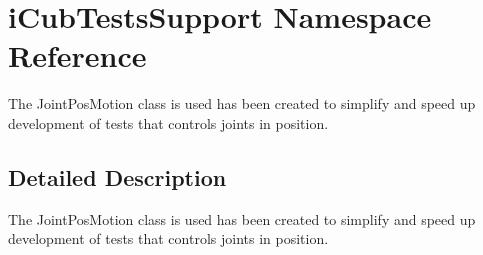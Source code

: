 \section{i\-Cub\-Tests\-Support Namespace Reference}
\label{namespaceiCubTestsSupport}


The Joint\-Pos\-Motion class is used has been created to simplify and speed up development of tests that controls joints in position.  




\subsection{Detailed Description}
The Joint\-Pos\-Motion class is used has been created to simplify and speed up development of tests that controls joints in position. 